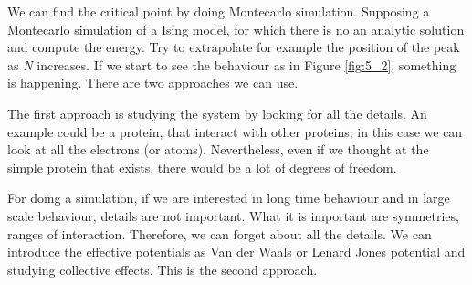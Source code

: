 \documentclass[../main/main.tex]{subfiles}
\begin{document}
We can find the critical point by doing Montecarlo simulation. Supposing a Montecarlo simulation of a Ising model, for which there is no an analytic solution and compute the energy.
Try to extrapolate for example the position of the peak as \emph{N} increases. If we start to see the behaviour as in Figure \ref{fig:5_2}, something is happening.
There are two approaches we can use.

 The first approach is studying the system by looking for all the details. An example could be a protein, that interact with other proteins; in this case we can look at all the electrons (or atoms). Nevertheless, even if we thought at the simple protein that exists, there would be a lot of degrees of freedom.

  For doing a simulation, if we are interested in long time behaviour and in large scale behaviour, details are not important. What it is important are symmetries, ranges of interaction. Therefore, we can forget about all the details. We can introduce the effective potentials as Van der Waals or Lenard Jones potential and studying collective effects. This is the second approach.
\end{document}
